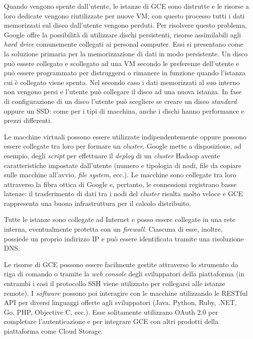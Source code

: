 Quando vengono spente dall’utente, le istanze di GCE sono distrutte e le risorse a loro dedicate vengono riutilizzate per nuove VM; con questo processo tutti i dati memorizzati
sul disco dall’utente vengono perduti. Per risolvere questo problema, Google offre la possibilità di utilizzare dischi persistenti, risorse assimilabili agli \textit{hard drive} 
comunemente collegati ai personal computer. Essi si presentano come la soluzione primaria per la memorizzazione di dati in modo persistente. Un disco può essere collegato 
e scollegato ad una VM secondo le preferenze dell’utente e può essere programmato per distruggersi o rimanere in funzione quando l’istanza cui è collegato viene spenta. Nel 
secondo caso i dati memorizzati al suo interno non vengono persi e l’utente può collegare il disco ad una nuova istanza. In fase di configurazione di un disco l’utente può 
scegliere se creare un disco \textit{standard} oppure un SSD: come per i tipi di macchina, anche i dischi hanno performance e prezzi differenti.

Le macchine virtuali possono essere utilizzate indipendentemente oppure possono essere collegate tra loro per formare un \textit{cluster}. Google mette a disposizione, ad esempio, 
degli \textit{script} per effettuare il \textit{deploy} di un \textit{cluster} Hadoop avente caratteristiche impostate dall’utente (numero e tipologia di nodi, file da copiare sulle macchine all’avvio, 
\textit{file system}, ecc.). Le macchine sono collegate tra loro attraverso la fibra ottica di Google e, pertanto, le connessioni registrano basse latenze: il trasferimento di dati 
tra i nodi del \textit{cluster} risulta molto veloce e GCE rappresenta una buona infrastruttura per il calcolo distribuito.

Tutte le istanze sono collegate ad Internet e posso essere collegate in una rete interna, eventualmente protetta con un \textit{firewall}. Ciascuna di esse, inoltre, possiede un 
proprio indirizzo IP e può essere identificata tramite una risoluzione DNS. 

Le risorse di GCE possono essere facilmente gestite attraverso lo strumento da riga di comando o tramite la \textit{web console} degli sviluppatori della piattaforma (in entrambi
i casi il protocollo SSH viene utilizzato per collegarsi alle istanze remote). I \textit{software} possono poi interagire con le macchine utilizzando le RESTful API per diversi 
linguaggi offerte agli sviluppatori (Java, Python, Ruby, .NET, Go, PHP, Objective C, ecc.). Esse solitamente utilizzano OAuth 2.0 per completare l’autenticazione e per integrare
GCE con altri prodotti della piattaforma come Cloud Storage.


